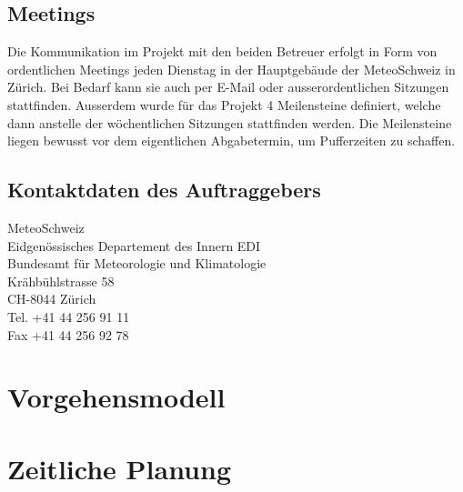 \documentclass[a4paper,10pt]{article}
\begin{document}
\subsection{Meetings}
Die Kommunikation im Projekt mit den beiden Betreuer erfolgt in Form von ordentlichen Meetings jeden Dienstag in der Hauptgebäude der MeteoSchweiz in Zürich. Bei Bedarf kann sie auch per E-Mail oder ausserordentlichen Sitzungen stattfinden. Ausserdem wurde für das Projekt 4 Meilensteine definiert, welche dann anstelle der wöchentlichen Sitzungen stattfinden werden. Die Meilensteine liegen bewusst vor dem eigentlichen Abgabetermin, um Pufferzeiten zu schaffen.

\subsection{Kontaktdaten des Auftraggebers}
MeteoSchweiz\\
Eidgenössisches Departement des Innern EDI \\
Bundesamt für Meteorologie und Klimatologie\\
Krähbühlstrasse 58\\
CH-8044 Zürich\\
Tel.   +41 44 256 91 11 \\
Fax   +41 44 256 92 78\\

\section{Vorgehensmodell}

\section{Zeitliche Planung}
\end{document}
